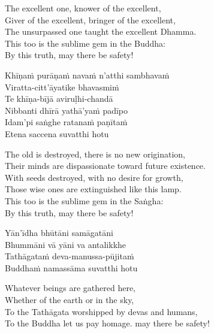 \ifninebythirteen\clearpage\fi

\begin{english-verses}
  The excellent one, knower of the excellent,\\
  Giver of the excellent, bringer of the excellent,\\
  The unsurpassed one taught the excellent Dhamma.\\
  This too is the sublime gem in the Buddha:\\
  By this truth, may there be safety!
\end{english-verses}

\begin{pali-hang-continued}
  Khīṇaṁ purāṇaṁ navaṁ n'atthi sambhavaṁ\\
  Viratta-citt'āyatike bhavasmiṁ\\
  Te khīṇa-bījā aviruḷhi-chandā\\
  Nibbanti dhīrā yathā'yaṁ padīpo\\
  Idam'pi saṅghe ratanaṁ paṇītaṁ\\
  \ifbfive\enlargethispage{1\baselineskip}\fi
  Etena saccena suvatthi hotu
\end{pali-hang-continued}

\begin{english-verses}
  The old is destroyed, there is no new origination,\\
  Their minds are dispassionate toward future existence.\\
  With seeds destroyed, with no desire for growth,\\
  Those wise ones are extinguished like this lamp.\\
  This too is the sublime gem in the Saṅgha:\\
  By this truth, may there be safety!
\end{english-verses}

\begin{pali-hang-continued}
  Yān'īdha bhūtāni samāgatāni\\
  Bhummāni vā yāni va antalikkhe\\
  Tathāgataṁ deva-manussa-pūjitaṁ\\
  Buddhaṁ namassāma suvatthi hotu
\end{pali-hang-continued}

\ifninebythirteen\clearpage\fi

\begin{english-verses}
  Whatever beings are gathered here,\\
  Whether of the earth or in the sky,\\
  To the Tathāgata worshipped by devas and humans, \\
  To the Buddha let us pay homage. may there be safety!
\end{english-verses}

